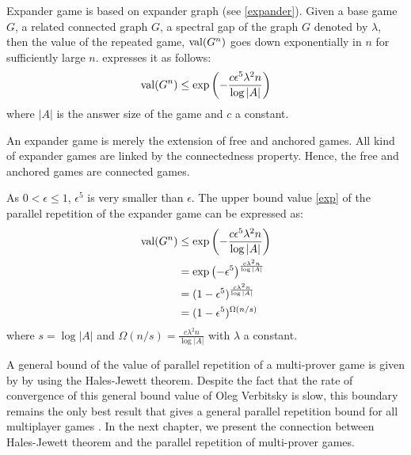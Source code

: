 Expander game is based on expander graph (see \eqref{expander}).  Given a base game $G$, a related connected graph $G$, a spectral gap of the graph $G$ denoted by $\lambda$,  then the value of the repeated game, $\mathrm{val} (G^n)$  goes down exponentially in $n$ for sufficiently large $n$. \cite{dinur2016multiplayer} expresses it as follows:
\begin{align}
\mathrm{val} (G^n) \leq \exp \left(-\frac{c \epsilon^5 \lambda^2 n }{\log |A|}\right) \label{exp}
\end{align}
where $|A|$ is the answer size of the game and $c$ a constant.

An expander game is  merely the extension of free and anchored games. All kind of expander games are linked by the connectedness property. Hence, the free and anchored games are connected games. 

As $0 < \epsilon \leq 1$, $\epsilon^5$ is very smaller than $\epsilon$. The upper bound value \eqref{exp} of the parallel repetition of the expander game can be expressed as:
\begin{align*}
\mathrm{val} (G^n) & \leq \exp \left(-\frac{c \epsilon^5 \lambda^2 n }{\log |A|}\right) \\
& =\exp \left(-\epsilon^5\right)^{\frac{c  \lambda^2 n }{\log |A|}} \\
& =(1-\epsilon^5)^{ \frac{c  \lambda^2 n }{\log |A|}} \\
& =(1-\epsilon^5)^{ \Omega(n/s)}
\end{align*}
where $s=\log |A|$ and $\Omega(n/s)=\frac{c  \lambda^2 n }{\log |A|}$ with  $\lambda$ a constant.

A general bound of the value of parallel repetition of a multi-prover game is  given by  \cite{verbitsky1996towards} by using the Hales-Jewett theorem. Despite the fact that the rate of  convergence of this general bound value of Oleg Verbitsky is slow, this boundary  remains the only best result that gives a general parallel repetition bound for all multiplayer games \citep{hkazla2016forbidden,dinur2016multiplayer}. In the next chapter, we present the connection between Hales-Jewett theorem and the parallel repetition of  multi-prover games. 


 
 
